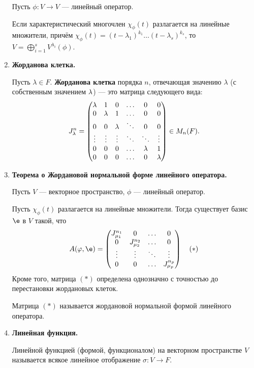 \begin{enumerate}
Пусть $\phi\colon V \rightarrow V$ --- линейный оператор.

Если характеристический многочлен $\chi_\phi(t)$ разлагается на линейные множители, причём $\chi_\phi(t) = (t - \lambda_1)^{k_1}\ldots(t - \lambda_s)^{k_s}$, то $V = \bigoplus_{i = 1}^s  V^{\lambda_i}(\phi)$.

\item \textbf{Жорданова клетка.}

Пусть $\lambda \in F$. \textbf{Жорданова клетка} порядка $n$, отвечающая значению $\lambda$ (с собственным значением $\lambda $) --- это матрица следующего вида:
\begin{gather*}
J_\lambda^n = 
\begin{pmatrix}
\lambda & 1 & 0 & \ldots & 0 & 0 \\
0 & \lambda & 1 & \ldots & 0 & 0 \\
0 & 0 & \lambda & \ddots & 0 & 0 \\
\vdots & \vdots & \vdots & \ddots & \ddots & \vdots \\
0 & 0 & 0 & \ldots & \lambda & 1 \\
0 & 0 & 0 & \ldots & 0 & \lambda
\end{pmatrix} \in M_n(F).
\end{gather*}

\item \textbf{Теорема о Жордановой нормальной форме линейного оператора.}

Пусть $V$ --- векторное пространство, $\phi$ --- линейный оператор.

Пусть $\chi_\phi(t)$ разлагается на линейные множители. Тогда существует базис $\e$ в $V$ такой, что 
\begin{gather*}
A(\phi, \e) = 
\begin{pmatrix*}
J_{\mu_1}^{n_1} & 0 & \ldots & 0 \\
0 & J_{\mu_2}^{n_2} & \ldots & 0 \\
\vdots & \vdots & \ddots & \vdots \\
0 & 0 & \ldots & J_{\mu_p}^{n_p}
\end{pmatrix*} \quad (*)
\end{gather*}
Кроме того, матрица $(*)$ определена однозначно с точностью до перестановки жордановых клеток.

Матрица $(*)$ называется жордановой нормальной формой линейного оператора.

\item \textbf{Линейная функция.}

Линейной функцией (формой, функционалом) на векторном пространстве $V$ называется всякое линейное отображение $\sigma \colon V \rightarrow F$.


\end{enumerate}
